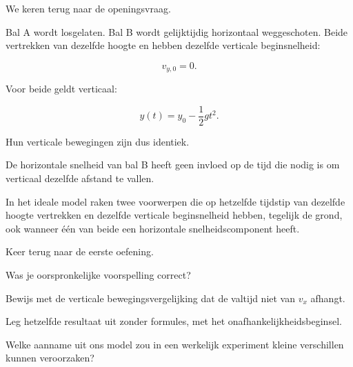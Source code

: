 \documentclass{ximera}
\begin{document}


We keren terug naar de openingsvraag.

Bal A wordt losgelaten. Bal B wordt gelijktijdig horizontaal
weggeschoten. Beide vertrekken van dezelfde hoogte en hebben dezelfde
verticale beginsnelheid:

\[
v_{y,0}=0.
\]

Voor beide geldt verticaal:

\[
y(t)=y_0-\frac12gt^2.
\]

Hun verticale bewegingen zijn dus identiek.

De horizontale snelheid van bal B heeft geen invloed op de tijd die
nodig is om verticaal dezelfde afstand te vallen.

\begin{eigenschap}

In het ideale model raken twee voorwerpen die op hetzelfde tijdstip
van dezelfde hoogte vertrekken en dezelfde verticale beginsnelheid
hebben, tegelijk de grond, ook wanneer één van beide een horizontale
snelheidscomponent heeft.

\end{eigenschap}


\begin{oefening}{\oefU\ESS}

Keer terug naar de eerste oefening.

\begin{question}
Was je oorspronkelijke voorspelling correct?
\end{question}

\begin{question}
Bewijs met de verticale bewegingsvergelijking dat de valtijd niet van
$v_x$ afhangt.
\end{question}

\begin{question}
Leg hetzelfde resultaat uit zonder formules, met het
onafhankelijkheidsbeginsel.
\end{question}

\begin{question}
Welke aanname uit ons model zou in een werkelijk experiment kleine
verschillen kunnen veroorzaken?
\end{question}

\end{oefening}
\end{document}
